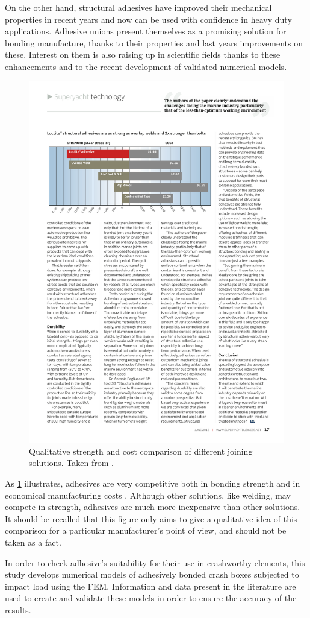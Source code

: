 \documentclass[
documentsize = a4, %
font = cmr, %
typesize = 11, %
printmode = true,
onehalfspacing = true,
language = en, %
titlepage = udciccp, %
degree = pt, %
dedication = true,
acknowledgements = true,
abstract-en = true,
abstract-es = false,
abstract-ga = false,
epigraphs = true,
toc = true,
lof = true,
lot = true,
frontmatterintoc = false,
notation = false,
minimal = false,
]{UDCthesis}
\begin{document}
On the other hand, structural adhesives have improved their mechanical properties in recent years and now can be used with confidence in heavy duty applications. Adhesive unions present themselves as a promising solution for bonding manufacture, thanks to their properties and last years improvements on these. Interest on them is also raising up in scientific fields thanks to these enhancements and to the recent development of validated numerical models.
\begin{figure}
	\centering
	\includegraphics[width=0.7\linewidth]{./IMG_CUTRES/comparison}
	\caption[Qualitative strength and cost comparison of different joining solutions.]{Qualitative strength and cost comparison of different joining solutions. Taken from \citet{superyacht}.}
	\label{fig:comparison}
\end{figure}

As \cref{fig:comparison} illustrates, adhesives are very competitive both in bonding strength and in economical manufacturing costs \citep{superyacht}. Although other solutions, like welding, may compete in strength, adhesives are much more inexpensive than other solutions. It should be recalled that this figure only aims to give a qualitative idea of this comparison for a particular manufacturer's point of view, and should not be taken as a fact.

In order to check adhesive's suitability for their use in crashworthy elements, this study develops numerical models of adhesively bonded crash boxes subjected to impact load  using the \gls{FEM}. Information and data present in the literature are used to create and validate these models in order to ensure the accuracy of the results.
\end{document}
